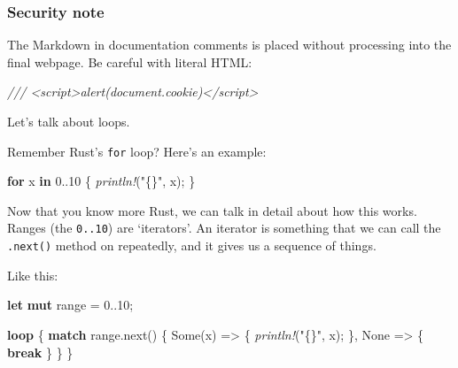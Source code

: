 \documentclass[a4paper,]{book}
\newenvironment{Shaded}{\begin{snugshade}}{\end{snugshade}}
\newcommand{\KeywordTok}[1]{\textcolor[rgb]{0.13,0.29,0.53}{\textbf{{#1}}}}
\newcommand{\DecValTok}[1]{\textcolor[rgb]{0.00,0.00,0.81}{{#1}}}
\newcommand{\ConstantTok}[1]{\textcolor[rgb]{0.00,0.00,0.00}{{#1}}}
\newcommand{\StringTok}[1]{\textcolor[rgb]{0.31,0.60,0.02}{{#1}}}
\newcommand{\CommentTok}[1]{\textcolor[rgb]{0.56,0.35,0.01}{\textit{{#1}}}}
\newcommand{\PreprocessorTok}[1]{\textcolor[rgb]{0.56,0.35,0.01}{\textit{{#1}}}}
\newcommand{\NormalTok}[1]{{#1}}
\begin{document}
\subsubsection{Security note}\label{security-note}

The Markdown in documentation comments is placed without processing into
the final webpage. Be careful with literal HTML:

\begin{Shaded}
\begin{Highlighting}[]
\CommentTok{/// <script>alert(document.cookie)</script>}
\end{Highlighting}
\end{Shaded}


Let's talk about loops.

Remember Rust's \texttt{for} loop? Here's an example:

\begin{Shaded}
\begin{Highlighting}[]
\KeywordTok{for} \NormalTok{x }\KeywordTok{in} \DecValTok{0.}\NormalTok{.}\DecValTok{10} \NormalTok{\{}
    \PreprocessorTok{println!}\NormalTok{(}\StringTok{"\{\}"}\NormalTok{, x);}
\NormalTok{\}}
\end{Highlighting}
\end{Shaded}

Now that you know more Rust, we can talk in detail about how this works.
Ranges (the \texttt{0..10}) are `iterators'. An iterator is something
that we can call the \texttt{.next()} method on repeatedly, and it gives
us a sequence of things.

Like this:

\begin{Shaded}
\begin{Highlighting}[]
\KeywordTok{let} \KeywordTok{mut} \NormalTok{range = }\DecValTok{0.}\NormalTok{.}\DecValTok{10}\NormalTok{;}

\KeywordTok{loop} \NormalTok{\{}
    \KeywordTok{match} \NormalTok{range.next() \{}
        \ConstantTok{Some}\NormalTok{(x) => \{}
            \PreprocessorTok{println!}\NormalTok{(}\StringTok{"\{\}"}\NormalTok{, x);}
        \NormalTok{\},}
        \ConstantTok{None} \NormalTok{=> \{ }\KeywordTok{break} \NormalTok{\}}
    \NormalTok{\}}
\NormalTok{\}}
\end{Highlighting}
\end{Shaded}
\end{document}
